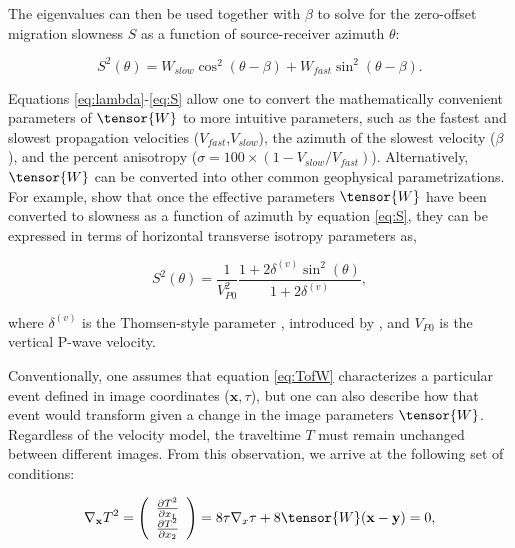 \noindent The eigenvalues can then be used together with $\beta $ to solve for the zero-offset migration slowness $S$ as a function of source-receiver azimuth $\theta $:

\begin{equation}
\label{eq:S}
S^2(\theta )=W_{slow}\cos^2(\theta -\beta )+W_{fast}\sin^2(\theta -\beta).
\end{equation}

Equations \ref{eq:lambda}-\ref{eq:S} allow one to convert the mathematically convenient parameters of $\tensor{W}$ to more intuitive parameters, such as the fastest and slowest propagation velocities ($V_{fast}$,$V_{slow}$), the azimuth of the slowest velocity ($\beta $), and the percent anisotropy ($\sigma = 100\times \left( 1-V_{slow}/V_{fast}\right)$).
Alternatively, $\tensor{W}$ can be converted into other common geophysical parametrizations. 
For example, \cite{GEO63-03-10791092} show that once the effective parameters $\tensor{W}$ have been converted to slowness as a function of azimuth by equation \ref{eq:S}, they can be expressed in terms of horizontal transverse isotropy parameters as,

\begin{equation}
\label{eq:thomsen-GT98-HTI}
S^2(\theta )=\frac{1}{V_{P0}^2}\frac{1+2\delta ^{(v)}\sin^2(\theta)}{1+2\delta ^{(v)}},
\end{equation}

\noindent where $\delta ^{(v)}$ is the Thomsen-style parameter \cite[]{GEO51-10-19541966}, introduced by \cite{GEO62-02-06140629}, and $V_{P0}$ is the vertical P-wave velocity.

Conventionally, one assumes that equation \ref{eq:TofW} characterizes a particular event defined in image coordinates ($\mathbf{x},\tau $), but one can also describe how that event would transform given a change in the image parameters $\tensor{W}$. Regardless of the velocity model, the traveltime $T$ must remain unchanged between different images.  From this observation, we arrive at the following set of conditions:

\begin{equation}
\label{eq:dTdx}
\nabla _{\mathbf{x}}T^2
=\left(
\begin{array}{c}
 \frac{\partial T^2 }{\partial x_1} \\
 \frac{\partial T^2 }{\partial x_2}
\end{array}
\right)=8\tau \nabla _x\tau +8\tensor{W}(\mathbf{x}-\mathbf{y})=0, 
\end{equation}

